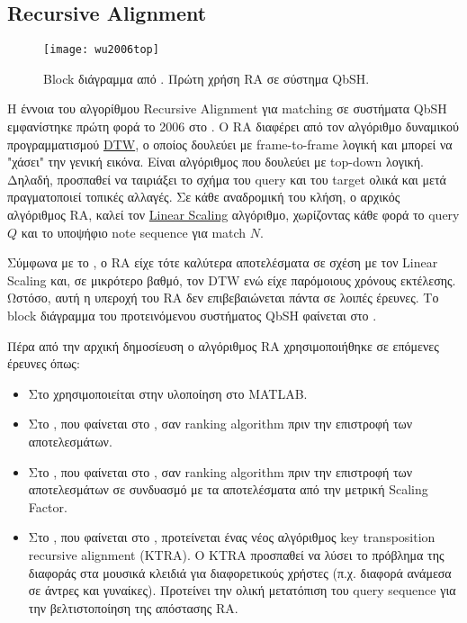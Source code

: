 \newcommand*{\ra}{Recursive Alignment}%
\subsection{\ra{}}
\begin{figure}
	\centering
	\texttt{[image: wu2006top]}
	\caption{Block διάγραμμα από \protect\cite{wu2006top}. Πρώτη χρήση RA σε σύστημα QbSH.}
	\label{fig:wu2006top}
\end{figure}
\forceendwrapfig{}
Η έννοια του αλγορίθμου \ra{} για matching σε συστήματα QbSH εμφανίστηκε πρώτη φορά το 2006 στο \cite{wu2006top}.
Ο RA διαφέρει από τον αλγόριθμο δυναμικού προγραμματισμού \hyperref[sub:DTW]{DTW},
ο οποίος δουλεύει με frame-to-frame λογική και μπορεί να "χάσει" την γενική εικόνα.
Είναι αλγόριθμος που δουλεύει με top-down λογική.
Δηλαδή, προσπαθεί να ταιριάξει το σχήμα του query και του target ολικά και μετά πραγματοποιεί τοπικές αλλαγές.
Σε κάθε αναδρομική του κλήση, ο αρχικός αλγόριθμος RA, καλεί τον \hyperref[sub:ls]{Linear Scaling} αλγόριθμο,
χωρίζοντας κάθε φορά το query $Q$ και το υποψήφιο note sequence για match $N$.

Σύμφωνα με το \cite{wu2006top},
ο RA είχε τότε καλύτερα αποτελέσματα σε σχέση με τον Linear Scaling και, σε μικρότερο βαθμό, τον DTW ενώ είχε παρόμοιους χρόνους εκτέλεσης.
Ωστόσο, αυτή η υπεροχή του RA δεν επιβεβαιώνεται πάντα σε λοιπές έρευνες.
Το block διάγραμμα του προτεινόμενου συστήματος QbSH φαίνεται στο .

Πέρα από την αρχική δημοσίευση ο αλγόριθμος RA χρησιμοποιήθηκε σε επόμενες έρευνες όπως:
\begin{itemize}
\item Στο \cite{ryynanen2008query} χρησιμοποιείται στην υλοποίηση στο MATLAB.
\item Στο \cite{wang2012query}, που φαίνεται στο , σαν ranking algorithm πριν την επιστροφή των αποτελεσμάτων.
\item Στο \cite{guo2012query}, που φαίνεται στο , σαν ranking algorithm πριν την επιστροφή των αποτελεσμάτων σε συνδυασμό με τα αποτελέσματα από την μετρική Scaling Factor.
\item Στο \cite{guo2013query}, που φαίνεται στο , προτείνεται ένας νέος αλγόριθμος key transposition recursive alignment (KTRA).
Ο KTRA προσπαθεί να λύσει το πρόβλημα της διαφοράς στα μουσικά κλειδιά για διαφορετικούς χρήστες (π.χ. διαφορά ανάμεσα σε άντρες και γυναίκες).
Προτείνει την ολική μετατόπιση του query sequence για την βελτιστοποίηση της απόστασης RA.
\end{itemize}

\undef{\ra}
